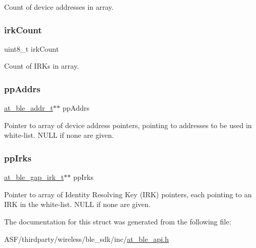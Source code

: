 Count of device addresses in array. \mbox{\label{structat__ble__gap__whitelist__t_a2264bf0e31aac88b0856e018c464968a}} 
\subsubsection{\texorpdfstring{irkCount}{irkCount}}
{\footnotesize\ttfamily uint8\+\_\+t irk\+Count}

Count of I\+R\+Ks in array. \mbox{\label{structat__ble__gap__whitelist__t_ad6b42a15127a7440c62e539669240593}} 
\subsubsection{\texorpdfstring{ppAddrs}{ppAddrs}}
{\footnotesize\ttfamily \mbox{\hyperlink{structat__ble__addr__t}{at\+\_\+ble\+\_\+addr\+\_\+t}}$\ast$$\ast$ pp\+Addrs}

Pointer to array of device address pointers, pointing to addresses to be used in white-\/list. N\+U\+LL if none are given. \mbox{\label{structat__ble__gap__whitelist__t_aaf277b9883c15b2e68b9592697389f31}} 
\subsubsection{\texorpdfstring{ppIrks}{ppIrks}}
{\footnotesize\ttfamily \mbox{\hyperlink{structat__ble__gap__irk__t}{at\+\_\+ble\+\_\+gap\+\_\+irk\+\_\+t}}$\ast$$\ast$ pp\+Irks}

Pointer to array of Identity Resolving Key (I\+RK) pointers, each pointing to an I\+RK in the white-\/list. N\+U\+LL if none are given. 

The documentation for this struct was generated from the following file\+:\begin{DoxyCompactItemize}
\item 
A\+S\+F/thirdparty/wireless/ble\+\_\+sdk/inc/\mbox{\hyperlink{at__ble__api_8h}{at\+\_\+ble\+\_\+api.\+h}}\end{DoxyCompactItemize}
